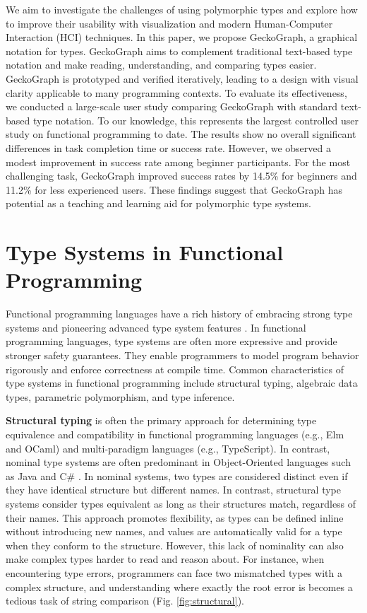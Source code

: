 \documentclass[preprint,12pt]{elsarticle}
\begin{document}
 We aim to investigate the challenges of using polymorphic types and explore how to improve their usability with visualization and modern Human-Computer Interaction (HCI) techniques. In this paper, we propose GeckoGraph, a graphical notation for types. GeckoGraph aims to complement traditional text-based type notation and make reading, understanding, and comparing types easier. GeckoGraph is prototyped and verified iteratively, leading to a design with visual clarity applicable to many programming contexts. 
 To evaluate its effectiveness, we conducted a large-scale user study comparing GeckoGraph with standard text-based type notation. To our knowledge, this represents the largest controlled user study on functional programming to date.
The results show no overall significant differences in task completion time or success rate. However, we observed a modest improvement in success rate among beginner participants. For the most challenging task, GeckoGraph improved success rates by 14.5\% for beginners and 11.2\% for less experienced users. These findings suggest that GeckoGraph has potential as a teaching and learning aid for polymorphic type systems.

\section{Type Systems in Functional Programming}

Functional programming languages have a rich history of embracing strong type systems and pioneering advanced type system features \cite{Milner1978-ob, MacQueen2020-qn, Hudak2007-kn}. In functional programming languages, type systems are often more expressive and provide stronger safety guarantees. They enable programmers to model program behavior rigorously and enforce correctness at compile time. Common characteristics of type systems in functional programming include structural typing, algebraic data types, parametric polymorphism, and type inference.

{\bf Structural typing} is often the primary approach for determining type equivalence and compatibility in functional programming languages (e.g., Elm and OCaml) and multi-paradigm languages (e.g., TypeScript). In contrast, nominal type systems are often predominant in Object-Oriented languages such as Java and C\# \cite{AbdelGawad2013-hh}. In nominal systems, two types are considered distinct even if they have identical structure but different names. In contrast, structural type systems consider types equivalent as long as their structures match, regardless of their names. This approach promotes flexibility, as types can be defined inline without introducing new names, and values are automatically valid for a type when they conform to the structure.  However, this lack of nominality can also make complex types harder to read and reason about. For instance, when encountering type errors, programmers can face two mismatched types with a complex structure, and understanding where exactly the root error is becomes a tedious task of string comparison (Fig. \ref{fig:structural}).
\end{document}
